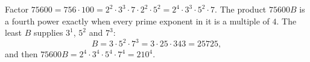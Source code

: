 Factor $75600=756\cdot100=2^2\cdot3^3\cdot7\cdot2^2\cdot5^2=2^4\cdot3^3\cdot5^2\cdot7$. The product $75600B$ is a fourth power exactly when every prime exponent in it is a multiple of $4$. The least $B$ supplies $3^1$, $5^2$ and $7^3$:
\[
B=3\cdot5^2\cdot7^3=3\cdot25\cdot343=\boxed{25725},
\]
and then $75600B=2^4\cdot3^4\cdot5^4\cdot7^4=210^4$.

